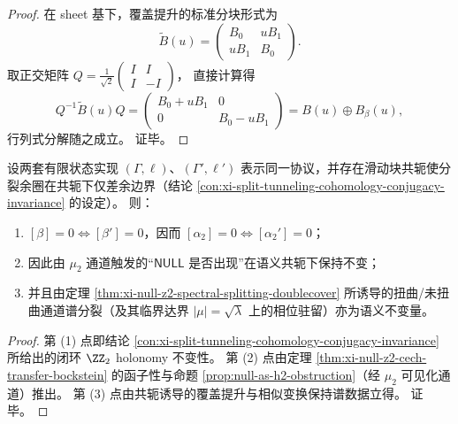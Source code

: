 \begin{proof}
在 sheet 基下，覆盖提升的标准分块形式为
\[
\widetilde B(u)=
\begin{pmatrix}
B_0 & uB_1\\
uB_1 & B_0
\end{pmatrix}.
\]
取正交矩阵
\(
Q=\frac1{\sqrt2}\begin{pmatrix}I&I\\ I&-I\end{pmatrix}
\)，
直接计算得
\[
Q^{-1}\widetilde B(u)Q=
\begin{pmatrix}
B_0+uB_1 & 0\\
0 & B_0-uB_1
\end{pmatrix}
=B(u)\oplus B_\beta(u),
\]
行列式分解随之成立。
证毕。
\end{proof}

\begin{theorem}\label{thm:xi-null-z2-conjugacy-rigidity}
设两套有限状态实现 \((\Gamma,\ell)\)、\((\Gamma',\ell')\) 表示同一协议，并存在滑动块共轭使分裂余圈在共轭下仅差余边界（结论 \ref{con:xi-split-tunneling-cohomology-conjugacy-invariance} 的设定）。
则：
\begin{enumerate}
  \item \([\beta]=0 \iff [\beta']=0\)，因而 \([\alpha_2]=0 \iff [\alpha_2'] =0\)；
  \item 因此由 \(\mu_2\) 通道触发的“\(\mathsf{NULL}\) 是否出现”在语义共轭下保持不变；
  \item 并且由定理 \ref{thm:xi-null-z2-spectral-splitting-doublecover} 所诱导的扭曲/未扭曲通道谱分裂（及其临界达界 \(|\mu|=\sqrt{\lambda}\) 上的相位驻留）亦为语义不变量。
\end{enumerate}
\end{theorem}

\begin{proof}
第 (1) 点即结论 \ref{con:xi-split-tunneling-cohomology-conjugacy-invariance} 所给出的闭环 \(\ZZ_2\) holonomy 不变性。
第 (2) 点由定理 \ref{thm:xi-null-z2-cech-transfer-bockstein} 的函子性与命题 \ref{prop:null-as-h2-obstruction}（经 \(\mu_2\) 可见化通道）推出。
第 (3) 点由共轭诱导的覆盖提升与相似变换保持谱数据立得。
证毕。
\end{proof}


